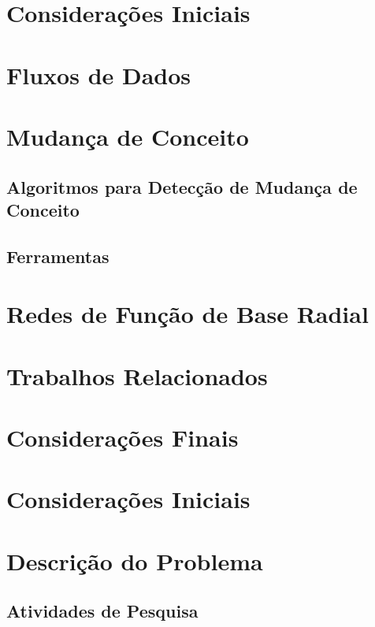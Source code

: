 \documentclass[qual, classic, a4paper]{ufbathesis}
\begin{document}
 \label{revisao_bibliografica}
\section{Considerações Iniciais}
\blindtext

\section{Fluxos de Dados}
\blindtext

\section{Mudança de Conceito}
\blindtext

\subsection{Algoritmos para Detecção de Mudança de Conceito}
\blindtext

\subsection{Ferramentas}
\blindtext

\section{Redes de Função de Base Radial}

\section{Trabalhos Relacionados}
\blindtext

\section{Considerações Finais}
\blindtext

 \label{plano_pesquisa}
\section{Considerações Iniciais}
\blindtext

\section{Descrição do Problema}
\blindtext

\subsection{Atividades de Pesquisa}
\blindtext
\end{document}
